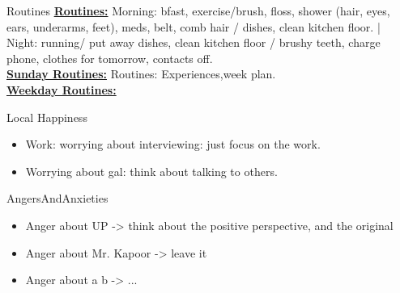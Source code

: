 \documentclass[serif, mathserif, final]{beamer}
\begin{document}
\begin{frame}
  \begin{columns}
    \begin{column}{0.25\linewidth} %
      \begin{block}{Routines}
      { \tiny\underline{ \bf Routines:} Morning: bfast, exercise/brush,
        floss, shower (hair, eyes, ears, underarms, feet), meds, belt,
        comb hair / dishes, clean kitchen floor. |  Night: running/ put
        away dishes, clean kitchen floor / brushy teeth, charge phone,
        clothes for tomorrow, contacts off.} \\ 
      {\tiny \underline{\bf Sunday Routines:} Routines: Experiences,week plan.} \\ 
      {\tiny \underline{\bf Weekday Routines:}}  
      \end{block} 
      \begin{block}{Local Happiness}
        \begin{itemize} 
          \tiny \item \tiny Work: worrying about interviewing: just focus on the work. 
        \item \tiny Worrying about gal: think about talking to others. 
        \end{itemize}
      \end{block} 
      \begin{block}{AngersAndAnxieties}
        \begin{itemize}
          \tiny \item \tiny Anger about UP -> think about the positive
          perspective, and the original
        \item \tiny Anger about Mr. Kapoor ->  leave it
        \item \tiny Anger about a b  -> ...
          


\end{itemize}
\end{block}
\end{column}
\end{columns}
\end{frame}
\end{document}
